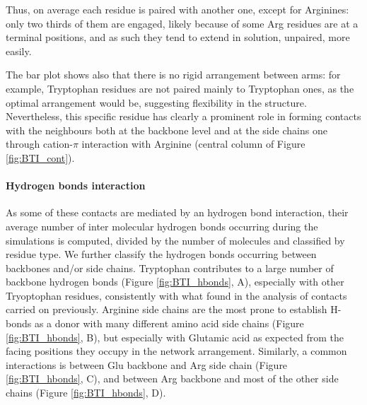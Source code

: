Thus, on average each residue is paired with another one, except for Arginines: only two thirds of them are engaged, likely because of some Arg residues are at a terminal positions, and as such they tend to extend in solution, unpaired, more easily.

The bar plot shows also that there is no rigid arrangement between arms: for example, Tryptophan residues are not paired mainly to Tryptophan ones, as the optimal arrangement would be, suggesting flexibility in the structure.
%
Nevertheless, this specific residue has clearly a prominent role in forming contacts with the neighbours both at the backbone level and at the side chains one through cation-$\pi$ interaction with Arginine (central column of Figure \ref{fig:BTI_cont}).

\paragraph{Hydrogen bonds interaction} As some of these contacts are mediated by an hydrogen bond interaction, their average number of inter molecular hydrogen bonds occurring during the simulations is computed, divided by the number of molecules and classified by residue type.
We further classify the hydrogen bonds occurring between backbones and/or side chains. Tryptophan contributes to a large number of backbone hydrogen bonds (Figure \ref{fig:BTI_hbonds}, A), especially with other Tryoptophan residues, consistently with what found in the analysis of contacts carried on previously. Arginine side chains are the most prone to establish H-bonds as a donor with many different amino acid side chains (Figure \ref{fig:BTI_hbonds}, B), but especially with Glutamic acid as expected from the facing positions they occupy in the network arrangement.
%
Similarly, a common interactions is between Glu backbone and Arg side chain (Figure \ref{fig:BTI_hbonds}, C), and between Arg backbone and most of the other side chains (Figure \ref{fig:BTI_hbonds}, D).
